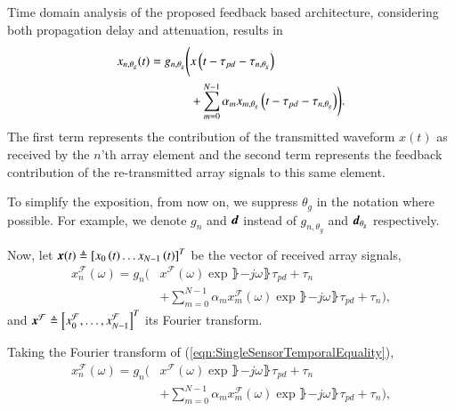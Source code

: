 Time domain analysis of the proposed feedback based architecture, considering both propagation delay and attenuation, results in 
\begin{equation}
    \label{eqn:SingleSensorTemporalEquality}
        \begin{split}
            x_{n,\theta_g}(t) = g_{n,\theta_g}\Bigg{(}&x\rBrace{t-\tau_{pd}-\tau_{n,\theta_g}}\\
            &+\sum_{m=0}^{N-1}{\alpha_{m}x_{m,\theta_g}\rBrace{t-\tau_{pd}-\tau_{n,\theta_g}}}\Bigg{)}.
        \end{split}
\end{equation}
The first term represents the contribution of the transmitted waveform $x(t)$ as received by the $n$'th array element and the second term represents the feedback contribution of the re-transmitted array signals to this same element.
\par To simplify the exposition, from now on, we suppress $\theta_{g}$ in the notation where possible. For example, we denote $g_n$ and $\boldsymbol{d}$ instead of $g_{n,\theta_g}$ and $\boldsymbol{d}_{\theta_{g}}$ respectively. 
\par Now, let $\boldsymbol{x}{\left({t}\right)}\triangleq\left[{x_{0}\left({t}\right)\hdots{}x_{N-1}\left({t}\right)}\right]^{T}$ be the vector of received array signals, 
\begin{equation}
    \label{eqn_singleSensorFourier}
        \begin{split}
            x_{n}^{\mathcal{F}}(\omega) =
            g_n\Bigg( & x^{\mathcal{F}}(\omega)
            \exp\rBrace{-j\omega\rBrace{\tau_{pd}+\tau_{n}}}
            \\&+\sum_{m=0}^{N-1}
            {
            \alpha_{m}x_{m}^{\mathcal{F}}(\omega)
            \exp\rBrace{-j\omega\rBrace{\tau_{pd}+\tau_{n}}}
            }\Bigg), 
        \end{split}
\end{equation}
and  $\boldsymbol{x}^{\mathcal{F}}\triangleq\left[{x_{0}^{\mathcal{F}},\hdots,x_{N-1}^{\mathcal{F}}}\right]^{T}$ its Fourier transform. 
\par Taking the Fourier transform of (\ref{eqn:SingleSensorTemporalEquality}),
\begin{equation}
    \label{eqn_singleSensorFourier}
        \begin{split}
            x_{n}^{\mathcal{F}}(\omega) =
            g_n\Bigg( & x^{\mathcal{F}}(\omega)
            \exp\rBrace{-j\omega\rBrace{\tau_{pd}+\tau_{n}}}
            \\&+\sum_{m=0}^{N-1}
            {
            \alpha_{m}x_{m}^{\mathcal{F}}(\omega)
            \exp\rBrace{-j\omega\rBrace{\tau_{pd}+\tau_{n}}}
            }\Bigg),
        \end{split}
\end{equation}

